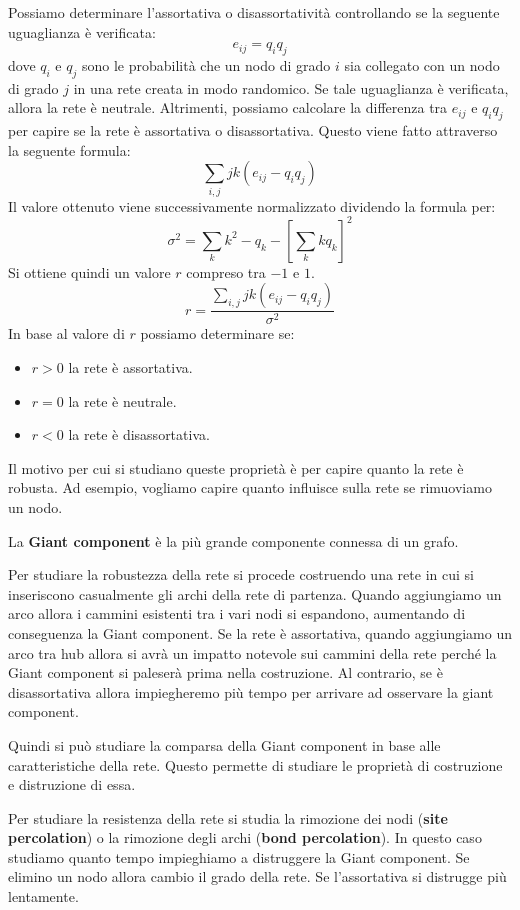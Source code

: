Possiamo determinare l'assortativa o disassortatività controllando se la seguente
uguaglianza è verificata:
\begin{equation}
    e_{ij} = q_iq_j
\end{equation}
dove $q_i$ e $q_j$ sono le probabilità che un nodo di grado $i$ sia collegato
con un nodo di grado $j$ in una rete creata in modo randomico. Se tale uguaglianza
è verificata, allora la rete è neutrale. Altrimenti, possiamo calcolare la
differenza tra $e_{ij}$ e $q_iq_j$ per capire se la rete è assortativa o
disassortativa. Questo viene fatto attraverso la seguente formula:
\begin{equation}
    \sum_{i, j}jk(e_{ij} - q_iq_j)
\end{equation}
Il valore ottenuto viene successivamente normalizzato dividendo la formula per:
\begin{equation}
    \sigma^2 = \sum_{k}k^2  - q_k - \left[\sum_{k}kq_k\right]^2
\end{equation}
Si ottiene quindi un valore $r$ compreso tra $-1$ e $1$.
\begin{equation}
    r = \frac{\sum_{i, j}jk(e_{ij} - q_iq_j)}{\sigma^2}
\end{equation}
In base al valore di $r$ possiamo determinare se:
\begin{itemize}
    \item $r > 0$ la rete è assortativa.
    \item $r = 0$ la rete è neutrale.
    \item $r < 0$ la rete è disassortativa.
\end{itemize}
Il motivo per cui si studiano queste proprietà è per capire quanto la rete è
robusta. Ad esempio, vogliamo capire quanto influisce sulla rete se rimuoviamo
un nodo.
\begin{definizione}
    La \textbf{Giant component} è la più grande componente connessa di un grafo.
\end{definizione}
Per studiare la robustezza della rete si procede costruendo una rete in cui si
inseriscono casualmente gli archi della rete di partenza. Quando aggiungiamo un
arco allora i cammini esistenti tra i vari nodi si espandono, aumentando di
conseguenza la Giant component. Se la rete è assortativa, quando aggiungiamo un
arco tra hub allora si avrà un impatto notevole sui cammini della rete perché la
Giant component si paleserà prima nella costruzione. Al contrario, se è
disassortativa allora impiegheremo più tempo per arrivare ad osservare la giant
component.

Quindi si può studiare la comparsa della Giant component in base alle caratteristiche
della rete. Questo permette di studiare le proprietà di costruzione e distruzione
di essa.

Per studiare la resistenza della rete si studia la rimozione dei nodi (\textbf{site
    percolation}) o la rimozione degli archi (\textbf{bond percolation}). In
questo caso studiamo quanto tempo impieghiamo a distruggere la Giant component.
Se elimino un nodo allora cambio il grado della rete. Se l'assortativa si distrugge
più lentamente.